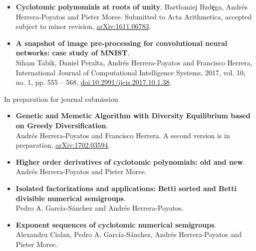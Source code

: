 \documentclass[10pt,a4paper,sans]{moderncv} %
\begin{document}
	\begin{itemize}
        \item \textbf{Cyclotomic polynomials at roots of unity}. Bart{\l}omiej Bzd\c{e}ga, Andrés Herrera-Poyatos and Pieter Moree. %
              Submitted to Acta Arithmetica, accepted subject to minor revision, \textcolor{colorl}{\href{https://arxiv.org/abs/1611.06783}{arXiv:1611.06783}}.
	\item \textbf{A snapshot of image pre-processing for convolutional neural networks: case study of MNIST}. \\ Siham Tabik, Daniel Peralta, Andrés Herrera-Poyatos and Francisco Herrera, International Journal of Computational Intelligence Systems, 2017, vol. 10, no. 1, pp. 555 -- 568, \textcolor{colorl}{\href{http://www.atlantis-press.com/journals/ijcis/25867315}{doi:10.2991/ijcis.2017.10.1.38}}.
	\end{itemize}
                          
{\large \textcolor{color1}{In preparation for journal submission}}

	\begin{itemize}
		\item \textbf{Genetic and Memetic Algorithm with Diversity Equilibrium based on Greedy Diversification}. \\ Andr\'es Herrera-Poyatos and Francisco Herrera.
          	A second version is in preparation, \textcolor{colorl}{\href{https://arxiv.org/abs/1702.03594}{arXiv:1702.03594}}.
		\item \textbf{Higher order derivatives of cyclotomic polynomials: old and new}. Andr\'es Herrera-Poyatos and Pieter Moree. %
		\item \textbf{Isolated factorizations and applications: Betti sorted and Betti divisible numerical semigroups}. \\ Pedro A. Garc\'ia-S\'anchez and Andr\'es Herrera-Poyatos. %
		\item \textbf{Exponent sequences of cyclotomic numerical semigroups}.\\ Alexandru Ciolan, Pedro A. Garc\'ia-S\'anchez, Andr\'es Herrera-Poyatos and Pieter Moree. %
		\end{itemize}
\end{document}
